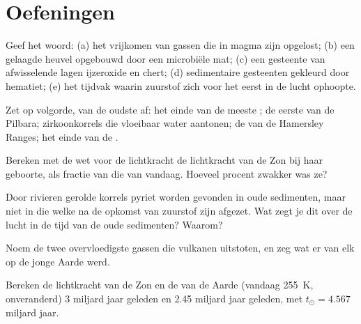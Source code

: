 \section{Oefeningen}

\begin{exercise}[$\star$]\label{exo:g12:early-earth:1}
Geef het woord: (a) het vrijkomen van gassen die in magma zijn opgelost; (b) een gelaagde
heuvel opgebouwd door een microbiële mat; (c) een gesteente van afwisselende lagen ijzeroxide en
chert; (d) sedimentaire gesteenten gekleurd door hematiet; (e) het tijdvak
waarin zuurstof zich voor het eerst in de lucht ophoopte.
\end{exercise}

\begin{exercise}[$\star$]\label{exo:g12:early-earth:2}
Zet op volgorde, van de oudste af: het einde van de meeste ; de
eerste  van de Pilbara; zirkoonkorrels die vloeibaar water aantonen; de
 van de Hamersley Ranges; het einde van de .
\end{exercise}

\begin{exercise}[$\star$]\label{exo:g12:early-earth:3}
Bereken met de wet voor de lichtkracht de lichtkracht van de Zon bij haar geboorte, als
fractie van die van vandaag. Hoeveel procent zwakker was ze?
\end{exercise}

\begin{exercise}[$\star$]\label{exo:g12:early-earth:4}
Door rivieren gerolde korrels pyriet worden gevonden in oude sedimenten, maar niet in
die welke na de opkomst van zuurstof zijn afgezet. Wat zegt je dit over de
lucht in de tijd van de oude sedimenten? Waarom?
\end{exercise}

\begin{exercise}[$\star$]\label{exo:g12:early-earth:5}
Noem de twee overvloedigste gassen die vulkanen uitstoten, en zeg wat er
van elk op de jonge Aarde werd.
\end{exercise}

\begin{exercise}[$\star\star$]\label{exo:g12:early-earth:6}
Bereken de lichtkracht van de Zon en de  van de Aarde (vandaag
\qty{255}{K},  onveranderd) 3 miljard jaar geleden en 2.45 miljard jaar
geleden, met $t_\odot = 4.567$ miljard jaar.
\end{exercise}

